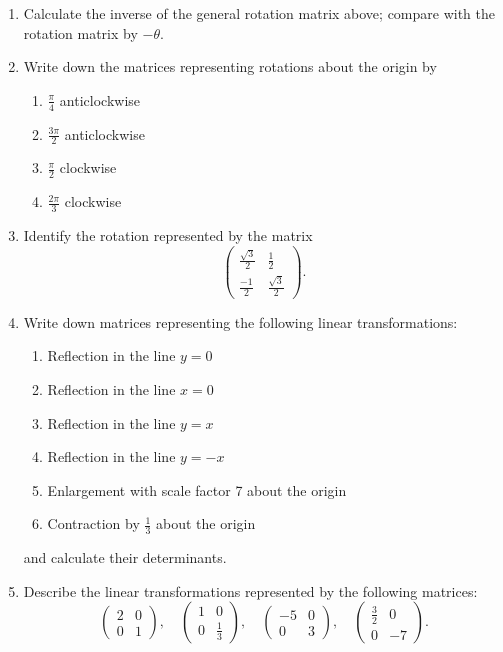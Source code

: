 \documentclass{article}
\begin{document}
\begin{enumerate}
	\item Calculate the inverse of the general rotation matrix above; compare with the rotation matrix by $-\theta$.
	\item Write down the matrices representing rotations about the origin by
		\begin{enumerate}
			\item $\frac{\pi}{4}$ anticlockwise
			\item $\frac{3\pi}{2}$ anticlockwise
			\item $\frac{\pi}{2}$ clockwise
			\item $\frac{2\pi}{3}$ clockwise
		\end{enumerate}
	\item Identify the rotation represented by the matrix
		\[\left(\begin{array}{cc} \frac{\sqrt{3}}{2}& \frac{1}{2}\\\frac{-1}{2} & \frac{\sqrt{3}}{2}\end{array}\right).\]
	\item Write down matrices representing the following linear transformations:
		\begin{enumerate}
			\item Reflection in the line $y=0$
			\item Reflection in the line $x=0$
			\item Reflection in the line $y=x$
			\item Reflection in the line $y=-x$
			\item Enlargement with scale factor 7 about the origin
			\item Contraction by $\frac{1}{3}$ about the origin
		\end{enumerate}
		and calculate their determinants.
	\item Describe the linear transformations represented by the following matrices:
		\[\left(\begin{array}{cc} 2 & 0\\ 0 & 1\end{array}\right),\quad \left(\begin{array}{cc} 1 & 0\\ 0 & \frac{1}{3}\end{array}\right),\quad \left(\begin{array}{cc} -5 & 0\\ 0 & 3\end{array}\right), \quad \left(\begin{array}{cc} \frac{3}{2} & 0\\ 0 & -7\end{array}\right).\]
\end{enumerate}
\end{document}
